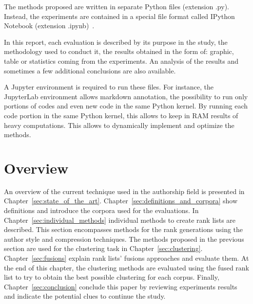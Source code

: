 The methods proposed are written in separate Python files (extension .py).
Instead, the experiments are contained in a special file format called IPython Notebook (extension .ipynb)~\cite{jupyter}.

In this report, each evaluation is described by its purpose in the study, the methodology used to conduct it, the results obtained in the form of: graphic, table or statistics coming from the experiments.
An analysis of the results and sometimes a few additional conclusions are also available.

A Jupyter environment is required to run these files.
For instance, the JupyterLab environment allows markdown annotation, the possibility to run only portions of codes and even new code in the same Python kernel.
By running each code portion in the same Python kernel, this allows to keep in RAM results of heavy computations.
This allows to dynamically implement and optimize the methods.

\section{Overview}

An overview of the current technique used in the authorship field is presented in Chapter~\ref{sec:state_of_the_art}.
Chapter~\ref{sec:definitions_and_corpora} show definitions and introduce the corpora used for the evaluations.
In Chapter~\ref{sec:individual_methods} individual methods to create rank lists are described.
This section encompasses methods for the rank generations using the author style and compression techniques.
The methods proposed in the previous section are used for the clustering task in Chapter~\ref{sec:clustering}.
Chapter~\ref{sec:fusions} explain rank lists' fusions approaches and evaluate them.
At the end of this chapter, the clustering methods are evaluated using the fused rank list to try to obtain the best possible clustering for each corpus.
Finally, Chapter~\ref{sec:conclusion} conclude this paper by reviewing experiments results and indicate the potential clues to continue the study.
